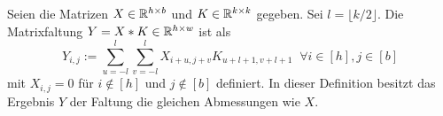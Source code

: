 


\begin{defi} \label{def:matrix_faltung}
    Seien die Matrizen $X \in \mathbb{R}^{h \times b}$ und $K \in \mathbb{R}^{k \times k}$ gegeben. Sei $l=\lfloor k/2  \rfloor$.
    Die Matrixfaltung  $Y=X \ast K \in \mathbb{R}^{h \times w}$ ist als 
    \begin{equation}
        \label{eq:matrix_faltung}
        Y_{i,j}:=\sum_{u=-l}^{l} \sum_{v=-l}^{l} X_{i+u,j+v} K_{u+l+1,v+l+1}\; \; \forall i \in [h], j \in [b]
    \end{equation} mit $X_{i,j}=0$ für $i \notin [h]$ und $j \notin [b]$ definiert. In dieser Definition besitzt das Ergebnis $Y$ der Faltung die gleichen Abmessungen wie $X$.
\end{defi}

